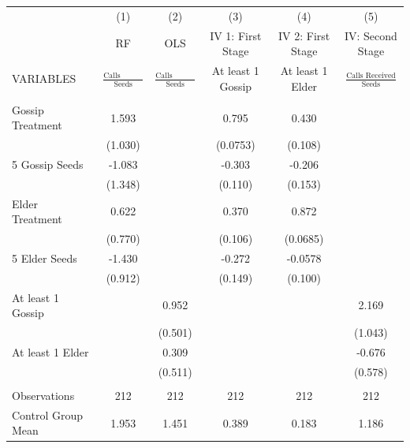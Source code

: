 \begin{tabular}{lccccc} \hline
 & (1) & (2) & (3) & (4) & (5) \\
 & RF & OLS & IV 1: First Stage & IV 2: First Stage & IV: Second Stage \\
VARIABLES & $\frac{\mbox{Calls Received}}{\mbox{Seeds}}$ & $\frac{\mbox{Calls Received}}{\mbox{Seeds}}$ & At least 1 Gossip & At least 1 Elder & $\frac{\mbox{Calls Received}}{\mbox{Seeds}}$ \\ \hline
 &  &  &  &  &  \\
Gossip Treatment & 1.593 &  & 0.795 & 0.430 &  \\
 & (1.030) &  & (0.0753) & (0.108) &  \\
5 Gossip Seeds & -1.083 &  & -0.303 & -0.206 &  \\
 & (1.348) &  & (0.110) & (0.153) &  \\
Elder Treatment & 0.622 &  & 0.370 & 0.872 &  \\
 & (0.770) &  & (0.106) & (0.0685) &  \\
5 Elder Seeds & -1.430 &  & -0.272 & -0.0578 &  \\
 & (0.912) &  & (0.149) & (0.100) &  \\
At least 1 Gossip &  & 0.952 &  &  & 2.169 \\
 &  & (0.501) &  &  & (1.043) \\
At least 1 Elder &  & 0.309 &  &  & -0.676 \\
 &  & (0.511) &  &  & (0.578) \\
 &  &  &  &  &  \\
Observations & 212 & 212 & 212 & 212 & 212 \\
 Control Group Mean & 1.953 & 1.451 & 0.389 & 0.183 & 1.186 \\ \hline
\end{tabular}
